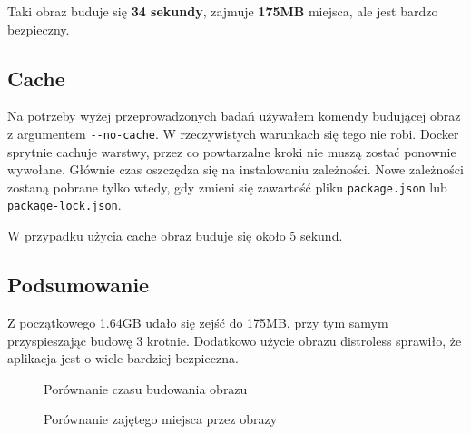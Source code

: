 \documentclass{article}
\begin{document}
Taki obraz buduje się \textbf{34 sekundy}, zajmuje \textbf{175MB} miejsca, ale jest bardzo bezpieczny.

\subsection{Cache}

Na potrzeby wyżej przeprowadzonych badań używałem komendy budującej obraz z argumentem \lstinline|--no-cache|. W rzeczywistych warunkach się tego nie robi. Docker sprytnie cachuje warstwy, przez co powtarzalne kroki nie muszą zostać ponownie wywołane. Głównie czas oszczędza się na instalowaniu zależności. Nowe zależności zostaną pobrane tylko wtedy, gdy zmieni się zawartość pliku \lstinline|package.json| lub \lstinline|package-lock.json|.

W przypadku użycia cache obraz buduje się około 5 sekund.

\newpage

\subsection{Podsumowanie}

Z początkowego 1.64GB udało się zejść do 175MB, przy tym samym przyspieszając budowę 3 krotnie. Dodatkowo użycie obrazu distroless sprawiło, że aplikacja jest o wiele bardziej bezpieczna.


\begin{figure}[H]
\centering
{}
\caption{Porównanie czasu budowania obrazu}
\label{fig:czas}
\end{figure}

\begin{figure}[H]
\centering
{}
\caption{Porównanie zajętego miejsca przez obrazy}
\label{fig:miejsce}
\end{figure}
\end{document}
